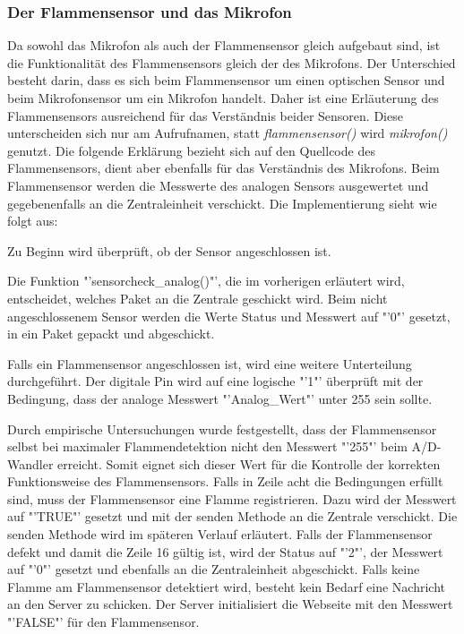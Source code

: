 \subsubsection*{Der Flammensensor und das Mikrofon}
	Da sowohl das Mikrofon als auch der Flammensensor gleich aufgebaut sind, ist die Funktionalität des Flammensensors gleich der des Mikrofons. Der Unterschied besteht darin, dass es sich beim Flammensensor um einen optischen Sensor und beim Mikrofonsensor um ein Mikrofon handelt. Daher ist eine Erläuterung des Flammensensors ausreichend für das Verständnis beider Sensoren. Diese unterscheiden sich nur am Aufrufnamen, statt \textit{flammensensor()} wird \textit{mikrofon()} genutzt. Die folgende Erklärung bezieht sich auf den Quellcode des Flammensensors, dient aber ebenfalls für das Verständnis des Mikrofons. Beim Flammensensor werden die Messwerte des analogen Sensors ausgewertet und gegebenenfalls an die Zentraleinheit verschickt. Die Implementierung sieht wie folgt aus:
	
	Zu Beginn wird überprüft, ob der Sensor angeschlossen ist. 
	
	Die Funktion "'sensorcheck\_analog()"', die im vorherigen  erläutert wird, entscheidet, welches Paket an die Zentrale geschickt wird. Beim nicht angeschlossenem Sensor werden die Werte Status und Messwert auf "'0"' gesetzt, in ein Paket gepackt und abgeschickt. 
	
	Falls ein Flammensensor angeschlossen ist, wird eine weitere Unterteilung durchgeführt. Der digitale Pin wird auf eine logische "'1"' überprüft mit der Bedingung, dass der analoge Messwert "'Analog\_Wert"' unter 255 sein sollte. 
	
	Durch empirische Untersuchungen wurde festgestellt, dass der Flammensensor selbst bei maximaler Flammendetektion nicht den Messwert "'255"' beim A/D-Wandler erreicht. Somit eignet sich dieser Wert für die Kontrolle der korrekten Funktionsweise des Flammensensors. Falls in Zeile acht die Bedingungen erfüllt sind, muss der Flammensensor eine Flamme registrieren. Dazu wird der Messwert auf "'TRUE"' gesetzt und mit der senden Methode an die Zentrale verschickt. Die senden Methode wird im späteren Verlauf erläutert. Falls der Flammensensor defekt und damit die Zeile 16 gültig ist, wird der Status auf "'2"', der Messwert auf "'0"' gesetzt und ebenfalls an die Zentraleinheit abgeschickt. Falls keine Flamme am Flammensensor detektiert wird, besteht kein Bedarf eine Nachricht an den Server zu schicken. Der Server initialisiert die Webseite mit den Messwert "'FALSE"' für den Flammensensor.
